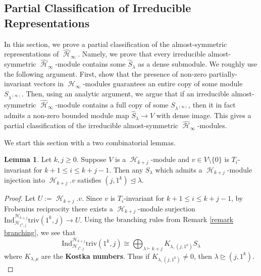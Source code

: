 \documentclass[12pt,reqno]{amsart}
\theoremstyle{definition}
\newtheorem{lem}[thm]{Lemma}
\DeclareMathOperator{\cH}{\mathcal{H}}
\begin{document}
\subsection{Partial Classification of Irreducible Representations}

In this section, we prove a partial classification of the almost-symmetric representations of $\widehat{\cH}_{\infty}.$ Namely, we prove that every irreducible almost-symmetric $\widehat{\cH}_{\infty}$-module contains some $\hat{S}_{\lambda}$ as a dense submodule. We roughly use the following argument. First, show that the presence of non-zero partially-invariant vectors in $\cH_{\infty}$-modules guarantees an entire copy of some module $S_{\lambda^{(\infty)}}.$ Then, using an analytic argument, we argue that if an irreducible almost-symmetric $\widehat{\cH}_{\infty}$-module contains a full copy of some $S_{\lambda^{(\infty)}}$, then it in fact admits a non-zero bounded module map $\hat{S}_{\lambda} \rightarrow V$ with dense image. This gives a partial classification of the irreducible almost-symmetric $\widehat{\cH}_{\infty}$-modules.

We start this section with a two combinatorial lemmas.

\begin{lem}\label{lem dominance criterion}
    Let $k,j \geq 0$. Suppose $V$ is a $\cH_{k+j}$-module and $v \in V \setminus \{0\}$ is $T_i$-invariant for $k+1 \leq i \leq k+j-1.$ Then any $S_{\lambda}$ which admits a $\cH_{k+j}$-module injection into $\cH_{k+j}.v$ satisfies $(j,1^k) \trianglelefteq \lambda.$
\end{lem}
\begin{proof}
Let $U:= \cH_{k+j}.v . $ Since $v$ is $T_i$-invariant for $k+1 \leq i \leq k+j-1$, by Frobenius reciprocity there exists a $\cH_{k+j}$-module surjection $\mathrm{Ind}_{\cH_{1^k,j}}^{\cH_{k+j}} \mathrm{triv}(1^k,j) \rightarrow U.$ Using the branching rules from Remark \ref{remark branching}, we see that 
$$\mathrm{Ind}_{\cH_{1^k,j}}^{\cH_{k+j}} \mathrm{triv}(1^k,j)  \cong \bigoplus_{\lambda \vdash k+j} K_{\lambda,(j,1^k)} S_{\lambda}$$ where $K_{\lambda,\mu}$ are the \textbf{Kostka numbers}. Thus if $K_{\lambda,(j,1^k)} \neq 0$, then $\lambda \trianglerighteq (j,1^k).$
\end{proof}
\end{document}
